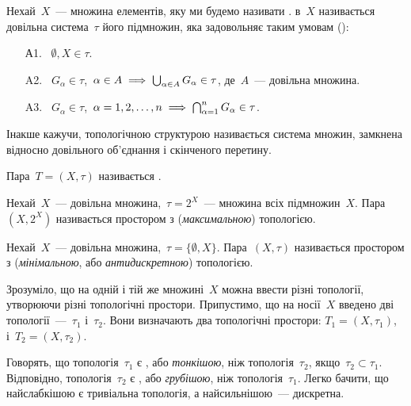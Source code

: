 \begin{definition}
    Нехай~$X$~--- множина елементів, яку ми будемо називати .  в~$X$ називається довільна система~$\tau$ його підмножин, яка задовольняє таким умовам ():
    \begin{enumerate}
        \item[А1.]~$\emptyset, X \in \tau$.
        \item[A2.]~$G_\alpha \in \tau$,~$\alpha \in A \implies \operatorname*{\bigcup}_{\alpha \in A} G_\alpha \in \tau$, де~$A$~--- довільна множина.
        \item[A3.]~$G_\alpha \in \tau$,~$\alpha = 1, 2, \dots, n \implies \operatorname*{\bigcap}_{\alpha = 1}^n G_\alpha \in \tau$.
    \end{enumerate}
\end{definition}

Інакше кажучи, топологічною структурою називається система множин, замкнена відносно довільного об'єднання і скінченого перетину.

\begin{definition}
    Пара~$T = (X, \tau)$ називається .
\end{definition}

\begin{example}
    Нехай~$X$~--- довільна множина,~$\tau = 2^X$~--- множина всіх підмножин~$X$. Пара~$(X, 2^X)$ називається простором з  (\emph{максимальною}) топологією.
\end{example}

\begin{example}
    Нехай~$X$~--- довільна множина,~$\tau = \{\emptyset, X\}$. Пара~$(X, \tau)$ називається простором з  (\emph{мінімальною}, або \emph{антидискретною}) топологією.
\end{example}

Зрозуміло, що на одній і тій же множині~$X$ можна ввести різні топології, утворюючи різні топологічні простори. Припустимо, що на носії~$X$ введено дві топології~---~$\tau_1$ і~$\tau_2$. Вони визначають два топологічні простори: $T_1 = (X, \tau_1)$, і~$T_2 = (X, \tau_2)$.

\begin{definition}
    Говорять, що топологія~$\tau_1$ є , або \emph{тонкішою}, ніж топологія~$\tau_2$, якщо~$\tau_2 \subset \tau_1$. Відповідно, топологія~$\tau_2$ є , або \emph{грубішою}, ніж топологія~$\tau_1$. Легко бачити, що найслабкішою є тривіальна топологія, а найсильнішою~--- дискретна.
\end{definition}

